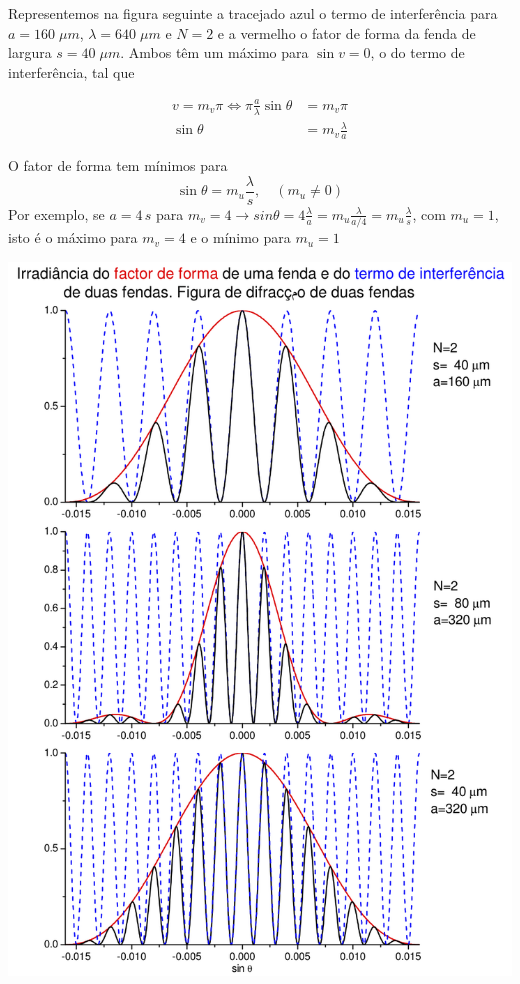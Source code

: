 \documentclass[a4paper,12pt]{article}
\begin{document}

Representemos na figura seguinte a tracejado azul o termo de interferência para $a=160\; \mu m$, 
$\lambda=640\; \mu m$ e $N=2$ e  a vermelho o fator de forma da fenda de largura  $s=40\; \mu m$.
Ambos têm um máximo para $\sin v=0$, o do termo de interferência,   tal que 

\begin{align}\label{eq:49}
	v= m_v \pi \Leftrightarrow  \pi \frac{ a}{\lambda} \sin \theta  &= m_v \pi  \nonumber \\
	 \sin \theta  &= m_v  \frac{\lambda}{ a}
\end{align}

O fator de forma   tem mínimos  para  
\begin{equation}
	 \sin \theta  = m_u  \frac{\lambda}{s}, \quad (m_u \ne 0)
\end{equation}
Por exemplo, se $a=4\, s$ para $m_v=4 \to sin \theta  = 4 \frac{\lambda}{a} = m_u \frac{\lambda}{a/4} = m_u \frac{\lambda}{s} $, com $ m_u=1$, 
isto é o máximo para $m_v= 4$ e o mínimo para $m_u=1$ 


\begin{center}
\includegraphics{./figura7}\label{fig:7} \\[1cm]  %
\end{center}
\end{document}
